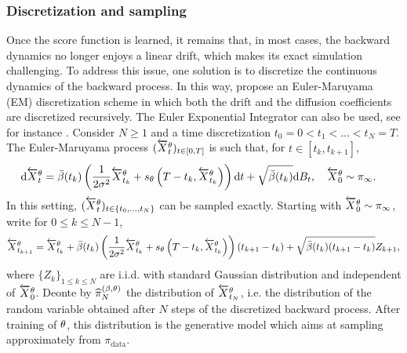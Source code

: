 \documentclass[english,graybox,envcountchap,envcountsame,sectrefs,shortlabels]{svmono}
\theoremstyle{style}
\newcommand{\eqsp}{}
\begin{document}
\subsubsection*{Discretization and sampling} 
Once the score function is learned, it remains that, in most cases, the backward dynamics no longer enjoys a linear drift, which makes its exact simulation challenging.  
To address this issue, one solution is to discretize the continuous dynamics of the backward process. 
In this way, \cite{song2021score} propose an Euler-Maruyama (EM) discretization scheme  in which both the drift and the diffusion coefficients are discretized recursively. 
The Euler Exponential Integrator  can also be used, see for instance  \cite{conforti2023}. Consider $N\geqslant 1$ and a time discretization $t_0 = 0 < t_1 <\ldots <t_N = T$. The Euler-Maruyama process  $(\overleftarrow X_t^{\theta})_{t \in [0,T]}$ is such that, for $t \in  [ t_k , t_{k+1} ]$,
\begin{align}
\label{eq:backward_EI_main}
\rmd \overleftarrow{X}^{\param}_t  &=  \bar \sched (t_k)\left(\frac{1}{2 \sigma^2} \overleftarrow{X}^{\param}_{t_k} +  s_{\param} \left( T-{t_k}, \ola{X}_{t_k}^{\param}  \right) \right)  \rmd t  
+  \sqrt{\bar \sched(t_k)} \rmd B_t, \quad \overleftarrow{X}^{\param}_0 \sim \pi_{\infty} \eqsp. 
\end{align} 
In this setting, $(\overleftarrow X_t^{\theta})_{t \in \{t_0, \hdots, t_N\}}$ can be sampled exactly. Starting with $\overleftarrow{X}^{\theta}_0 \sim \pi_\infty$, write for $0\leq k \leq N-1$,
$$
\overleftarrow{X}^{\param}_{t_{k+1}} = \overleftarrow{X}^{\param}_{t_k} + \bar \sched (t_k)\left(\frac{1}{2 \sigma^2} \overleftarrow{X}^{\param}_{t_k} +  s_{\param} \left( T-{t_k}, \ola{X}_{t_k}^{\param}  \right) \right) (t_{k+1} - t_k) + \sqrt{\bar \sched(t_k)(t_{k+1} - t_k)}Z_{k+1}\eqsp,
$$
where $\{Z_k\}_{1\leq k \leq N}$ are i.i.d. with standard Gaussian distribution and independent of $\overleftarrow{X}^{\theta}_0$. Deonte by $\widehat{\pi}_N^{(\beta,\theta)}$ the distribution of $\overleftarrow{X}^{\theta}_{t_N}$, i.e. the distribution of the random variable obtained after $N$ steps of the discretized backward process. After training of $\theta$, this distribution is the generative model which aims at sampling approximately from $\pi_{\mathrm{data}}$.
\end{document}
